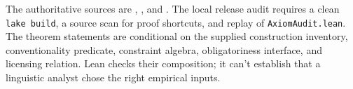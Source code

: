 \documentclass[12pt,letterpaper]{article}
\begin{document}
The authoritative sources are ,
, and . The local
release audit requires a clean \texttt{lake build}, a source scan for proof
shortcuts, and replay of \texttt{AxiomAudit.lean}. The theorem statements are
conditional on the supplied construction inventory, conventionality predicate,
constraint algebra, obligatoriness interface, and licensing relation. Lean
checks their composition; it can't establish that a linguistic analyst chose
the right empirical inputs.

\clearpage
\begin{sloppypar}
\printbibliography[title=References]
\end{sloppypar}
\end{document}
